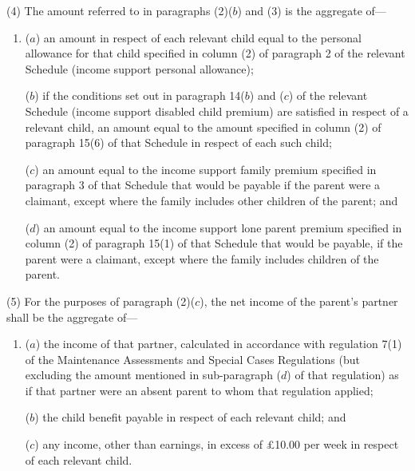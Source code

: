 \documentclass[a4paper]{article}
\begin{document}
(4) The amount referred to in paragraphs (2)($b$) and (3) is the aggregate of—
\begin{enumerate}\item[]
($a$) an amount in respect of each relevant child equal to the personal allowance for that child specified in column (2) of paragraph 2 of the relevant Schedule (income support personal allowance);

($b$) if the conditions set out in paragraph 14($b$) and ($c$) of the relevant Schedule (income support disabled child premium) are satisfied in respect of a relevant child, an amount equal to the amount specified in column (2) of paragraph 15(6) of that Schedule in respect of each such child;

($c$) an amount equal to the income support family premium specified in paragraph 3 of that Schedule that would be payable if the parent were a claimant, except where the family includes other children of the parent; and

($d$) an amount equal to the income support lone parent premium specified in column (2) of paragraph 15(1) of that Schedule that would be payable, if the parent were a claimant, except where the family includes children of the parent.
\end{enumerate}

(5) For the purposes of paragraph (2)($c$), the net income of the parent’s partner shall be the aggregate of—
\begin{enumerate}\item[]
($a$) the income of that partner, calculated in accordance with regulation 7(1) of the Maintenance Assessments and Special Cases Regulations (but excluding the amount mentioned in sub-paragraph ($d$) of that regulation) as if that partner were an absent parent to whom that regulation applied;

($b$) the child benefit payable in respect of each relevant child; and

($c$) any income, other than earnings, in excess of £10.00 per week in respect of each relevant child.
\end{enumerate}
\end{document}
